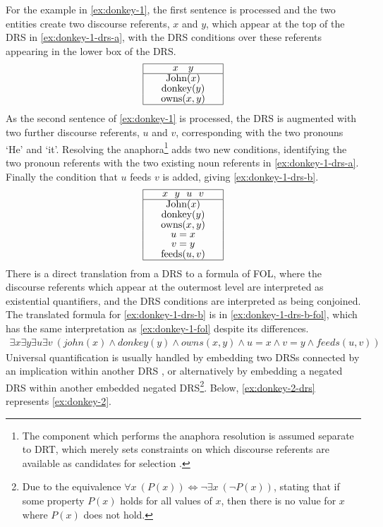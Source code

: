 \documentclass[a4paper,12pt,leqno]{article}
\def\drs#1#2{
\renewcommand{\arraystretch}{0.8}
\begin{tabular}[c]{|>{\hspace{1pc}}c<{\hspace{1pc}}|}
	\hline #1 \\
	\hline #2 \\
	\hline
\end{tabular}
\renewcommand{\arraystretch}{1}
}
\begin{document}
For the example in \cref{ex:donkey-1}, the first sentence is processed and the two entities create two discourse referents, $x$ and $y$, which appear at the top of the DRS in \cref{ex:donkey-1-drs-a}, with the DRS conditions over these referents appearing in the lower box of the DRS.
\begin{align}
	\drs{$x~~~y$}{John($x$)\\donkey($y$)\\owns($x, y$)}\label{ex:donkey-1-drs-a}
\end{align}
As the second sentence of \cref{ex:donkey-1} is processed, the DRS is augmented with two further discourse referents, $u$ and $v$, corresponding with the two pronouns `He' and `it'. Resolving the anaphora\footnote{The component which performs the anaphora resolution is assumed separate to DRT, which merely sets constraints on which discourse referents are available as candidates for selection \citep[p. 399]{Bird2009}.} adds two new conditions, identifying the two pronoun referents with the two existing noun referents in \cref{ex:donkey-1-drs-a}. Finally the condition that $u$ feeds $v$ is added, giving \cref{ex:donkey-1-drs-b}.
\begin{align}
	\drs{$x~~y~~u~~v$}{John($x$)\\donkey($y$)\\owns($x, y$)\\$u = x$\\$v = y$\\feeds($u, v$)}\label{ex:donkey-1-drs-b}
\end{align}
There is a direct translation from a DRS to a formula of FOL, where the discourse referents which appear at the outermost level are interpreted as existential quantifiers, and the DRS conditions are interpreted as being conjoined. The translated formula for \cref{ex:donkey-1-drs-b} is in \cref{ex:donkey-1-drs-b-fol}, which has the same interpretation as \cref{ex:donkey-1-fol} despite its differences.
\begin{align}
	\exists x \exists y \exists u \exists v ~(john(x) \land donkey(y) \land owns(x,y) \land u = x \land v = y \land feeds(u, v))\label{ex:donkey-1-drs-b-fol}
\end{align}
Universal quantification is usually handled by embedding two DRSs connected by an implication within another DRS \citep[p. 98]{kamp1988discourse}, or alternatively by embedding a negated DRS within another embedded negated DRS\footnote{Due to the equivalence $\forall x~(P(x)) \Longleftrightarrow \lnot \exists x ~(\lnot P(x))$, stating that if some property $P(x)$ holds for all values of $x$, then there is no value for $x$ where $P(x)$ does not hold.}. Below, \cref{ex:donkey-2-drs} represents \cref{ex:donkey-2}.
\end{document}
